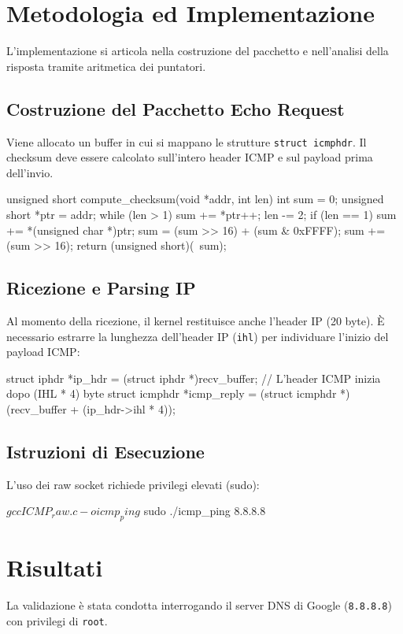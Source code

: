\documentclass[a4paper,12pt]{article}
\begin{document}
\section{Metodologia ed Implementazione}
L'implementazione si articola nella costruzione del pacchetto e nell'analisi della risposta tramite aritmetica dei puntatori.

\subsection{Costruzione del Pacchetto Echo Request}
Viene allocato un buffer in cui si mappano le strutture \texttt{struct icmphdr}. Il checksum deve essere calcolato sull'intero header ICMP e sul payload prima dell'invio.
\begin{ccode}
unsigned short compute_checksum(void *addr, int len) {
    int sum = 0; unsigned short *ptr = addr;
    while (len > 1) { sum += *ptr++; len -= 2; }
    if (len == 1) sum += *(unsigned char *)ptr;
    sum = (sum >> 16) + (sum & 0xFFFF);
    sum += (sum >> 16);
    return (unsigned short)(~sum);
}
\end{ccode}

\subsection{Ricezione e Parsing IP}
Al momento della ricezione, il kernel restituisce anche l'header IP (20 byte). È necessario estrarre la lunghezza dell'header IP (\texttt{ihl}) per individuare l'inizio del payload ICMP:
\begin{ccode}
struct iphdr *ip_hdr = (struct iphdr *)recv_buffer;
// L'header ICMP inizia dopo (IHL * 4) byte
struct icmphdr *icmp_reply = (struct icmphdr *)(recv_buffer + (ip_hdr->ihl * 4));
\end{ccode}


\subsection{Istruzioni di Esecuzione}
L'uso dei raw socket richiede privilegi elevati (sudo):
\begin{terminal}
$ gcc ICMP_raw.c -o icmp_ping
$ sudo ./icmp_ping 8.8.8.8
\end{terminal}

\section{Risultati}
La validazione è stata condotta interrogando il server DNS di Google (\texttt{8.8.8.8}) con privilegi di \texttt{root}.
\end{document}

